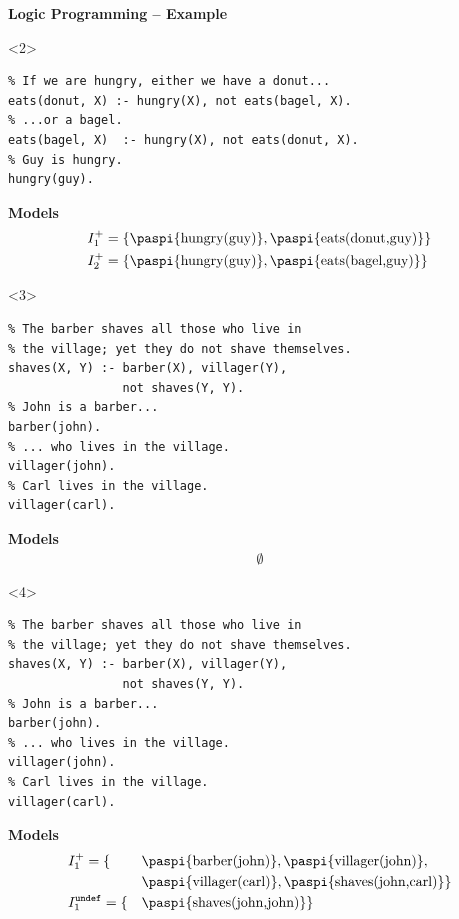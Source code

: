 \documentclass[aspectratio=169]{beamer}
\begin{document}
\begin{frame}[fragile]{\textbf{Logic Programming -- Example}}
\begin{minipage}{0.5\textwidth}
\begin{onlyenv}
\end{onlyenv}
\begin{onlyenv}<2>
  \begin{verbatim}
% If we are hungry, either we have a donut...
eats(donut, X) :- hungry(X), not eats(bagel, X).
% ...or a bagel.
eats(bagel, X)  :- hungry(X), not eats(donut, X).
% Guy is hungry.
hungry(guy).
  \end{verbatim}
  \vspace{0.5cm}
  {\centering\textcolor{palette-blue}{\bfseries Models}}
  \begin{align*}
    &I_1^+=\{\text{\paspi{hungry(guy)}}, \text{\paspi{eats(donut,guy)}}\}\\
    &I_2^+=\{\text{\paspi{hungry(guy)}}, \text{\paspi{eats(bagel,guy)}}\}\\
  \end{align*}
\end{onlyenv}
\begin{onlyenv}<3>
  \begin{verbatim}
% The barber shaves all those who live in
% the village; yet they do not shave themselves.
shaves(X, Y) :- barber(X), villager(Y),
                not shaves(Y, Y).
% John is a barber...
barber(john).
% ... who lives in the village.
villager(john).
% Carl lives in the village.
villager(carl).
  \end{verbatim}
  \vspace{0.5cm}
  {\centering\textcolor{palette-blue}{\bfseries Models}}
  \begin{align*}
    \emptyset
  \end{align*}
\end{onlyenv}
\begin{onlyenv}<4>
  \begin{verbatim}
% The barber shaves all those who live in
% the village; yet they do not shave themselves.
shaves(X, Y) :- barber(X), villager(Y),
                not shaves(Y, Y).
% John is a barber...
barber(john).
% ... who lives in the village.
villager(john).
% Carl lives in the village.
villager(carl).
  \end{verbatim}
  \vspace{0.5cm}
  {\centering\textcolor{palette-blue}{\bfseries Models}}
  \begin{alignat*}{2}
    &I_1^+=\{&&\text{\paspi{barber(john)}}, \text{\paspi{villager(john)}},\\
    &        &&\text{\paspi{villager(carl)}}, \text{\paspi{shaves(john,carl)}}\}\\
    &I_1^{\text{\texttt{undef}}}=\{&&\text{\paspi{shaves(john,john)}}\}

\end{alignat*}
\end{onlyenv}
\end{minipage}
\end{frame}
\end{document}
